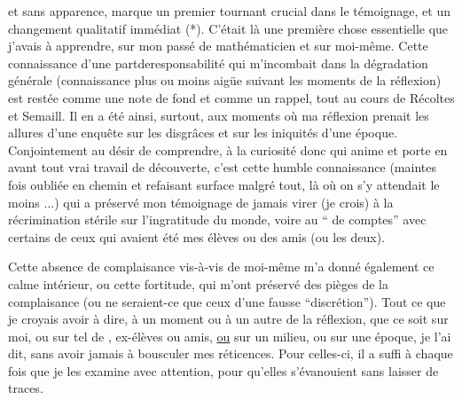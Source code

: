 et sans apparence, marque un premier tournant crucial dans le témoignage, et un changement qualitatif immédiat (*). C'était là une première chose essentielle que j'avais à apprendre, sur mon passé de mathématicien et sur moi-même. Cette connaissance d'une p\enspace a\enspace r\enspace t\quad d\enspace e\quad r\enspace e\enspace s\enspace p\enspace o\enspace n\enspace s\enspace a\enspace b\enspace i\enspace l\enspace i\enspace t\enspace é qui m'incombait dans la dégradation générale (connaissance plus ou moins aigüe suivant les moments de la réflexion) est restée comme une note de fond et comme un rappel, tout au cours de Récoltes et Semaill. Il en a été ainsi, surtout, aux moments où ma réflexion prenait les allures d'une enquête sur les disgrâces et sur les iniquités d'une époque. Conjointement au désir de comprendre, à la curiosité donc qui anime et porte en avant tout vrai travail de découverte, c'est cette humble connaissance (maintes fois oubliée en chemin et refaisant surface malgré tout, là où on s'y attendait le moins ...) qui a préservé mon témoignage de jamais virer (je crois) à la récrimination stérile sur l'ingratitude du monde, voire au `` de comptes'' avec certains de ceux qui avaient été mes élèves ou des amis (ou les deux).

Cette absence de complaisance vis-à-vis de moi-même m'a donné également ce calme intérieur, ou cette fortitude, qui m'ont préservé des pièges de la complaisance (ou ne seraient-ce que ceux d'une fausse ``discrétion''). Tout ce que je croyais avoir à dire, à un moment ou à un autre de la réflexion, que ce soit sur moi, ou sur tel de , ex-élèves ou amis, \uline{ou} sur un milieu, ou sur une époque, je l'ai dit, sans avoir jamais à bousculer mes réticences. Pour celles-ci, il a suffi à chaque fois que je les examine avec attention, pour qu'elles s'évanouient sans laisser de traces.
